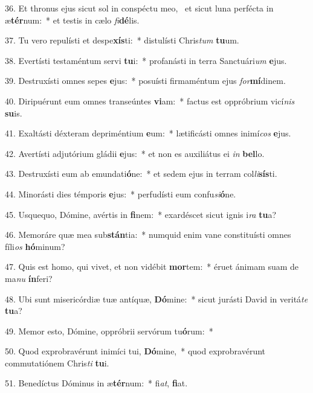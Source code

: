 36. Et thronus ejus sicut sol in conspéctu meo, \dag\  et sicut luna perfécta in æ\textbf{tér}num:~*  et testis in cælo \textit{fi}\textbf{dé}lis.\

37. Tu vero repulísti et despe\textbf{xís}ti:~*  distulísti Chris\textit{tum} \textbf{tu}um.\

38. Evertísti testaméntum servi \textbf{tu}i:~*  profanásti in terra Sanctuári\textit{um} \textbf{e}jus.\

39. Destruxísti omnes sepes \textbf{e}jus:~*  posuísti firmaméntum ejus \textit{for}\textbf{mí}dinem.\

40. Diripuérunt eum omnes transeúntes \textbf{vi}am:~*  factus est oppróbrium vicí\textit{nis} \textbf{su}is.\

41. Exaltásti déxteram depriméntium \textbf{e}um:~*  lætificásti omnes inimí\textit{cos} \textbf{e}jus.\

42. Avertísti adjutórium gládii \textbf{e}jus:~*  et non es auxiliátus ei \textit{in} \textbf{bel}lo.\

43. Destruxísti eum ab emundati\textbf{ó}ne:~*  et sedem ejus in terram col\textit{li}\textbf{sís}ti.\

44. Minorásti dies témporis \textbf{e}jus:~*  perfudísti eum confu\textit{si}\textbf{ó}ne.\

45. Usquequo, Dómine, avértis in \textbf{fi}nem:~*  exardéscet sicut ignis i\textit{ra} \textbf{tu}a?\

46. Memoráre quæ mea sub\textbf{stán}tia:~*  numquid enim vane constituísti omnes fíli\textit{os} \textbf{hó}minum?\

47. Quis est homo, qui vivet, et non vidébit \textbf{mor}tem:~*  éruet ánimam suam de ma\textit{nu} \textbf{ín}feri?\

48. Ubi sunt misericórdiæ tuæ antíquæ, \textbf{Dó}mine:~*  sicut jurásti David in veritá\textit{te} \textbf{tu}a?\

49. Memor esto, Dómine, oppróbrii servórum tu\textbf{ó}rum:~*  \

50. Quod exprobravérunt inimíci tui, \textbf{Dó}mine,~*  quod exprobravérunt commutatiónem Chris\textit{ti} \textbf{tu}i.\

51. Benedíctus Dóminus in æ\textbf{tér}num:~*  fi\textit{at}, \textbf{fi}at.\

